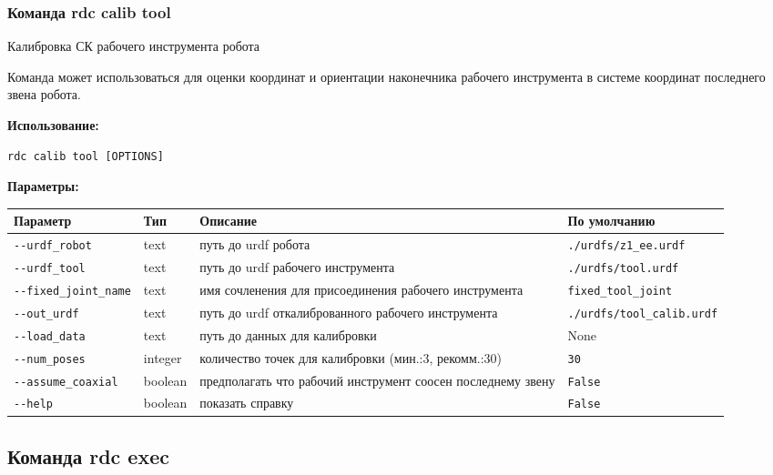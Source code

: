\hypertarget{rdc-calib-tool}{%
\subsubsection{ Команда rdc calib tool}\label{rdc-calib-tool}}

Калибровка СК рабочего инструмента робота

Команда может использоваться для оценки координат и ориентации наконечника рабочего инструмента в системе координат последнего звена робота.

\textbf{Использование:}
\begin{lstlisting}[language=python, numbers=none, frame=single]
rdc calib tool [OPTIONS]
\end{lstlisting}

\textbf{Параметры:}
\begin{center}
\fontsize{10pt}{10pt}\selectfont
\begin{longtable}[]{p{4.5cm}|p{2cm}|p{4.0cm}|p{5.2cm}}
    \hline
\toprule()
Параметр & Тип & Описание & По умолчанию \\
\hline
\midrule()
\endhead
\texttt{-\/-urdf\_robot} & text & путь до urdf робота &
\texttt{./urdfs/z1\_ee.urdf} \\
\hline
\texttt{-\/-urdf\_tool} & text & путь до urdf рабочего инструмента &
\texttt{./urdfs/tool.urdf} \\
\hline
\texttt{-\/-fixed\_joint\_name} & text & имя сочленения для присоединения рабочего инструмента &
\texttt{fixed\_tool\_joint} \\
\hline
\texttt{-\/-out\_urdf} & text & путь до urdf откалиброванного рабочего инструмента &
\texttt{./urdfs/tool\_calib.urdf} \\
\hline
\texttt{-\/-load\_data} & text & путь до данных для калибровки & None \\
\hline
\texttt{-\/-num\_poses} & integer & количество  точек для калибровки
(мин.:3, рекомм.:30) & \texttt{30} \\
\hline
\texttt{-\/-assume\_coaxial} & boolean & предполагать что рабочий инструмент соосен последнему звену & \texttt{False} \\
\hline
\texttt{-\/-help} & boolean & показать справку &
\texttt{False} \\
\bottomrule()
\hline
\end{longtable}
\end{center}

\hypertarget{rdc-exec}{%
\subsection{Команда rdc exec}\label{rdc-exec}}

